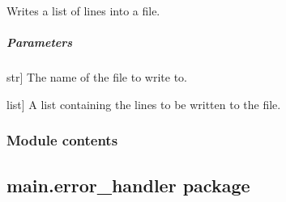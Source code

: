 \documentclass[letterpaper,10pt,english]{sphinxmanual}
\begin{document}
\begin{fulllineitems}
\begin{fulllineitems}
\begin{description}
\end{description}

\end{fulllineitems}


\begin{fulllineitems}
\label{\detokenize{main.doxygen_management:main.doxygen_management.file_handler.FileHandler.write_file}}
\pysigstartsignatures
{}
\pysigstopsignatures
\sphinxAtStartPar
Writes a list of lines into a file.


\subparagraph{Parameters}
\label{\detokenize{main.doxygen_management:id26}}\begin{description}
\sphinxlineitem{filename}{[}str{]}
\sphinxAtStartPar
The name of the file to write to.

\sphinxlineitem{lines}{[}list{]}
\sphinxAtStartPar
A list containing the lines to be written to the file.

\end{description}

\end{fulllineitems}


\end{fulllineitems}



\subsubsection{Module contents}
\label{\detokenize{main.doxygen_management:module-main.doxygen_management}}\label{\detokenize{main.doxygen_management:module-contents}}
\sphinxstepscope


\subsection{main.error\_handler package}
\label{\detokenize{main.error_handler:main-error-handler-package}}\label{\detokenize{main.error_handler::doc}}
\end{document}
